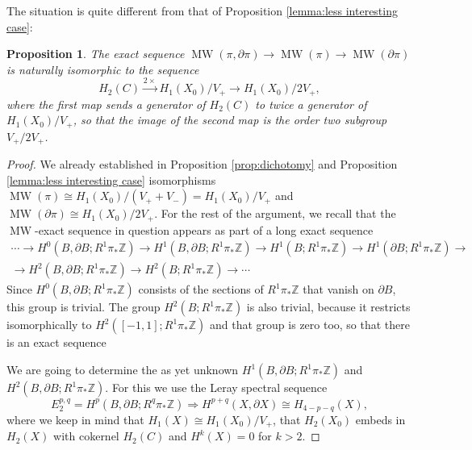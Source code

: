\documentclass[10pt,letterpaper]{amsart}
\numberwithin{equation}{section}
\def\ZZ{{\mathbb Z}}
\newcommand{\p}{\partial}
\newcommand\MW{\operatorname{MW}}
\newtheorem{proposition}[theorem]{Proposition}
\theoremstyle{remark}
\begin{document}
The situation is quite different from that of Proposition \ref{lemma:less interesting case}:

\begin{proposition}\label{prop:equinodalMW}The exact sequence $\MW(\pi, \p\pi)\to \MW(\pi)\to \MW(\p\pi)$ is naturally isomorphic to the sequence 
\[
H_2(C) \xrightarrow{2\times} H_1(X_0)/V_+\to H_1(X_0)/ 2 V_+,
\]
where  the first map sends a generator of $H_2(C)$ to twice a generator of  $H_1(X_0)/V_+$, so that the image of the second map is the order two subgroup $V_+/2 V_+$.
\end{proposition}
\begin{proof}
We already established in Proposition \ref{prop:dichotomy} and  Proposition \ref{lemma:less interesting case} isomorphisms $\MW(\pi)\cong H_1(X_0)/(V_++V_-)=H_1(X_0)/V_+$ and  $\MW(\p\pi)\cong H_1(X_0)/ 2 V_+$. For the rest of the argument, we recall that the $\MW$-exact sequence in question appears as part of a long exact sequence
\begin{multline*}
\cdots\to H^0(B, \p B;R^1\pi_*\ZZ)\to H^1(B, \p B;R^1\pi_*\ZZ)\to H^1(B;R^1\pi_*\ZZ)\to H^1(\p B;R^1\pi_*\ZZ)\to\\
\to  H^2(B, \p B;R^1\pi_*\ZZ)\to H^2(B;R^1\pi_*\ZZ)\to\cdots
\end{multline*}
Since $H^0(B, \p B;R^1\pi_*\ZZ)$ consists of the  sections of $R^1\pi_*\ZZ$ that vanish on $\p B$, this group is trivial.
The group  $H^2(B;R^1\pi_*\ZZ)$ is also trivial, because  it restricts isomorphically to $H^2([-1,1];R^1\pi_*\ZZ)$ and that group is zero too, so that there is an exact sequence
\begin{center}
\begin{small}
\end{small}
\end{center}
We are going to determine the as yet unknown $H^1(B, \p B;R^1\pi_*\ZZ)$ and $H^2(B, \p B;R^1\pi_*\ZZ)$.
For this we use the Leray spectral sequence 
\[
E_2^{p,q}=H^p(B, \p B; R^q\pi_*\ZZ)\Rightarrow H^{p+q}(X, \p X)\cong H_{4-p-q}(X),
\]
where we keep in mind that $H_1(X)\cong H_1(X_0)/V_+$, that  $H_2(X_0)$ embeds in $H_2(X)$ with cokernel  
$H_2(C)$  and $H^k(X)=0$ for $k>2$.


\end{proof}
\end{document}
